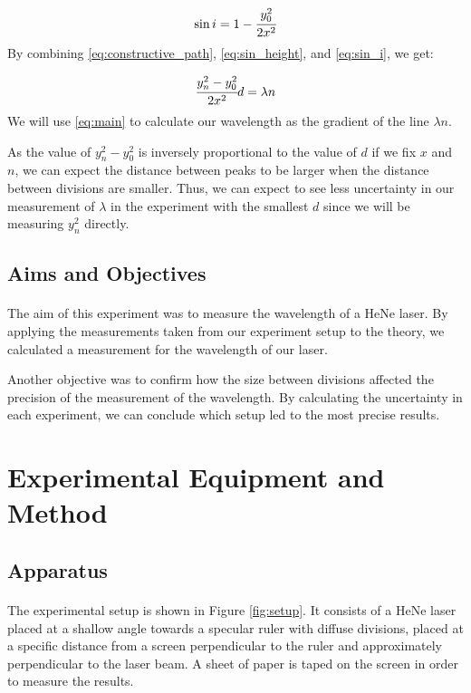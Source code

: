 \documentclass{article}
\begin{document}
\begin{equation}\label{eq:sin_i}
  \sin{i} = 1 - \cfrac{ y_{0}^{2} }{ 2x^2 }
\end{equation}
By combining \eqref{eq:constructive_path}, \eqref{eq:sin_height}, and \eqref{eq:sin_i}, we get:

\begin{equation}\label{eq:main}
  \cfrac{
    y_{n}^{2} - y_{0}^{2}
  }{
    2x^2
  } d = \lambda n
\end{equation}
We will use \eqref{eq:main} to calculate our wavelength as the gradient of the line $\lambda n$.

As the value of $y_{n}^{2} - y_{0}^{2}$ is inversely proportional to the value of $d$ if we fix $x$ and $n$, we can expect the distance between peaks to be larger when the distance between divisions are smaller. Thus, we can expect to see less uncertainty in our measurement of $\lambda$ in the experiment with the smallest $d$ since we will be measuring $y_{n}^{2}$ directly.

\subsection{Aims and Objectives}
\paragraph{}
The aim of this experiment was to measure the wavelength of a HeNe laser.  By applying the measurements taken from our experiment setup to the theory, we calculated a measurement for the wavelength of our laser.

Another objective was to confirm how the size between divisions affected the precision of the measurement of the wavelength. By calculating the uncertainty in each experiment, we can conclude which setup led to the most precise results.

\section{Experimental Equipment and Method}
\subsection{Apparatus}

\paragraph{}
The experimental setup is shown in Figure \ref{fig:setup}. It consists of a HeNe laser placed at a shallow angle towards a specular ruler with diffuse divisions, placed at a specific distance from a screen perpendicular to the ruler and approximately perpendicular to the laser beam.
A sheet of paper is taped on the screen in order to measure the results.
\end{document}
